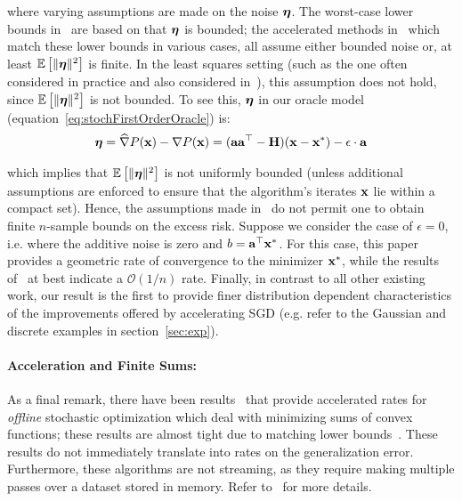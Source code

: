 \vspace{-0.2cm}
\noindent where varying assumptions are made on the noise $\boldsymbol{\eta}$. The
worst-case lower bounds in~\cite{NemirovskyY83} are based
on that $\boldsymbol{\eta}$ is bounded; the accelerated methods in~\citet{Lan08,HuKP09,ghadimi2012optimal,ghadimi2013optimal,DieuleveutFB16}
which match these lower bounds in various cases, all assume either
bounded noise or, at least $\mathbb{E}\left[\|\boldsymbol{\eta}\|^2\right]$ is finite. In
the least squares setting (such as the one often considered in
practice and also considered in~\citet{PolyakJ92,BachM13,DefossezB15,DieuleveutB15,FrostigGKS15,JainKKNS16}),
this assumption does not hold, since $\mathbb{E}\left[\|\boldsymbol{\eta}\|^2\right]$ is
not bounded. To see this, $\boldsymbol{\eta}$ in our oracle model (equation~\ref{eq:stochFirstOrderOracle}) is:
\vspace{-0.2cm}
\begin{align}
  \label{eq:noiseModel2}
\boldsymbol{\eta}=\widehat{\nabla}P(\mathbf{x})-\nabla P(\mathbf{x})=(\mathbf{a}\mathbf{a}^{\top}-\mathbf{H})(\mathbf{x}-\mathbf{x}^*)-\epsilon\cdot\mathbf{a}
\end{align}

\vspace{-0.2cm}
\noindent which implies that $\mathbb{E}\left[\|\boldsymbol{\eta}\|^2\right]$ is not uniformly bounded (unless
additional assumptions are enforced to ensure that the algorithm's
iterates $\mathbf{x}$ lie within a compact set).  Hence, the assumptions made
in~\cite{HuKP09,ghadimi2012optimal,ghadimi2013optimal,DieuleveutFB16}
do not permit one to obtain finite $n$-sample bounds on the excess
risk.  Suppose we consider the case of $\epsilon=0$, i.e. where the
additive noise is zero and $b=\mathbf{a} ^{\top} \mathbf{x}^*$.  For this case, this
paper provides a geometric rate of convergence to the minimizer $\mathbf{x}^*$,
while the results of~\cite{ghadimi2012optimal,ghadimi2013optimal,DieuleveutFB16}
at best indicate a $\mathcal{O}(1/n)$ rate. Finally, in contrast to all other existing work, our result is the first to provide finer distribution dependent characteristics of the improvements offered by accelerating SGD (e.g.  refer to the Gaussian and discrete examples in section~\ref{sec:exp}).

\paragraph{Acceleration and Finite Sums:} As a final remark, there have been
results~\citep{ShwartzZ14,FrostigGKS15b,LinMH15,LanZ15,Zhu16} that provide accelerated
rates for {\em offline} stochastic optimization which deal with
minimizing sums of convex functions; these results are almost
tight due to matching lower bounds~\citep{LanZ15,WoodworthS16}. These
results do not immediately translate into rates on the generalization
error.
Furthermore, these algorithms are not streaming, as they require making multiple passes over a
dataset stored in memory. Refer to~\citet{FrostigGKS15} for more details.\vspace*{-2mm}

